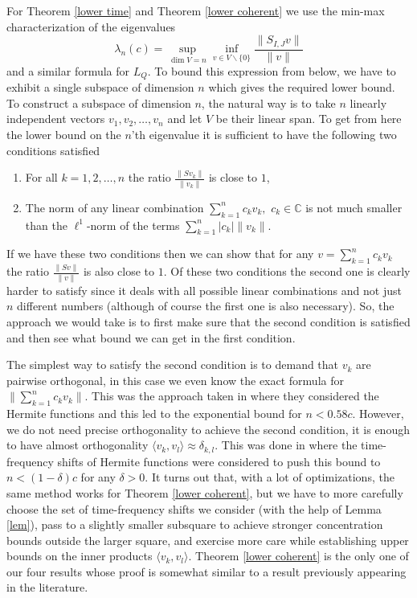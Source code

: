 \documentclass[12pt]{amsart}
\numberwithin{equation}{section}
\newcommand{\Cm}{\mathbb{C}}
\begin{document}
For Theorem \ref{lower time} and Theorem \ref{lower coherent} we use the min-max characterization of the eigenvalues
$$\lambda_n(c) = \sup_{\dim V = n} \inf_{v\in V\backslash \{0\}} \frac{\|S_{I, J} v\|}{\|v\|}$$
and a similar formula for $L_Q$. To bound this expression from below, we have to exhibit a single subspace of dimension $n$ which gives the required lower bound. To construct a subspace of dimension $n$, the natural way is to take $n$ linearly independent vectors  $v_1, v_2, \ldots , v_n$ and let $V$ be their linear span. To get from here the lower bound on the $n$'th eigenvalue it is sufficient to have the following two conditions satisfied
\begin{enumerate}
\item For all $k = 1, 2, \ldots , n$ the ratio $\frac{\|S v_k\|}{\|v_k\|}$ is close to $1$,
\item The norm of any linear combination $\sum_{k=1}^n c_k v_k,\,\, c_k\in \Cm$ is not much smaller than the $\ell^1$-norm of the terms $\sum_{k=1}^n |c_k| \|v_k\|$.
\end{enumerate}
If we have these two conditions then we can show that for any $v = \sum_{k=1}^n c_k v_k$ the ratio $\frac{\| Sv\|}{\|v\|}$ is also close to $1$. Of these two conditions the second one is clearly harder to satisfy since it deals with all possible linear combinations and not just $n$ different numbers (although of course the first one is also necessary). So, the approach we would take is to first make sure that the second condition is satisfied and then see what bound we can get in the first condition.

The simplest way to satisfy the second condition is to demand that $v_k$ are pairwise orthogonal, in this case we even know the exact formula for $\|\sum_{k=1}^n  c_k v_k\|$. This was the approach taken in \cite{Jam} where they considered the Hermite functions and this led to the exponential bound for $n < 0.58 c$. However, we do not need precise orthogonality to achieve the second condition, it is enough to have almost orthogonality $\langle v_k, v_l\rangle \approx \delta_{k, l}$. This was done in \cite{Kulikov} where the time-frequency shifts of Hermite functions were considered to push this bound to $n < (1-\delta)c$ for any $\delta > 0$. It turns out that, with a lot of optimizations, the same method works for Theorem \ref{lower coherent}, but we have to more carefully choose the set of time-frequency shifts we consider (with the help of Lemma \ref{lem}), pass to a slightly smaller subsquare to achieve stronger concentration bounds outside the larger square, and exercise more care while establishing upper bounds on the inner products $\langle v_k, v_l\rangle$. Theorem \ref{lower coherent} is the only one of our four results whose proof is somewhat similar to a result previously appearing in the literature.
\end{document}
